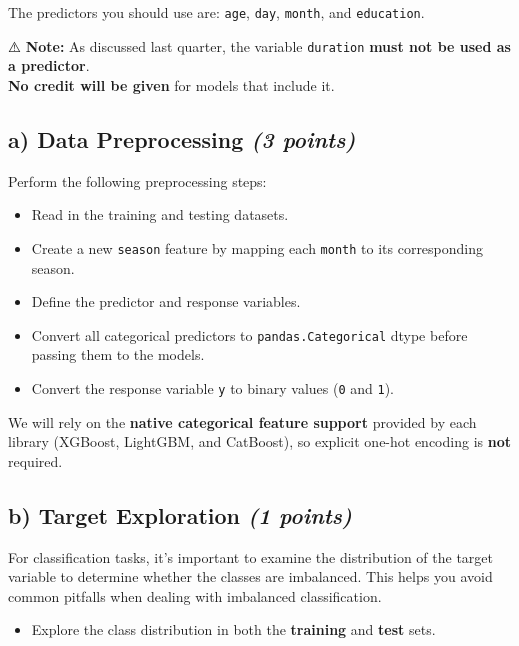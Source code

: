 \documentclass[
  letterpaper,
  DIV=11,
  numbers=noendperiod]{scrreprt}
\providecommand{\tightlist}{%
  \setlength{\itemsep}{0pt}\setlength{\parskip}{0pt}}\usepackage{longtable,booktabs,array}
\begin{document}
The predictors you should use are: \texttt{age}, \texttt{day},
\texttt{month}, and \texttt{education}.

⚠️ \textbf{Note:} As discussed last quarter, the variable
\texttt{duration} \textbf{must not be used as a predictor}.\\
\textbf{No credit will be given} for models that include it.

\subsection{\texorpdfstring{a) Data Preprocessing \emph{(3
points)}}{a) Data Preprocessing (3 points)}}\label{a-data-preprocessing-3-points}

Perform the following preprocessing steps:

\begin{itemize}
\tightlist
\item
  Read in the training and testing datasets.
\item
  Create a new \texttt{season} feature by mapping each \texttt{month} to
  its corresponding season.
\item
  Define the predictor and response variables.
\item
  Convert all categorical predictors to \texttt{pandas.Categorical}
  dtype before passing them to the models.
\item
  Convert the response variable \texttt{y} to binary values (\texttt{0}
  and \texttt{1}).
\end{itemize}

We will rely on the \textbf{native categorical feature support} provided
by each library (XGBoost, LightGBM, and CatBoost), so explicit one-hot
encoding is \textbf{not} required.

\subsection{\texorpdfstring{b) Target Exploration \emph{(1
points)}}{b) Target Exploration (1 points)}}\label{b-target-exploration-1-points}

For classification tasks, it's important to examine the distribution of
the target variable to determine whether the classes are imbalanced.
This helps you avoid common pitfalls when dealing with imbalanced
classification.

\begin{itemize}
\tightlist
\item
  Explore the class distribution in both the \textbf{training} and
  \textbf{test} sets.
\end{itemize}
\end{document}
